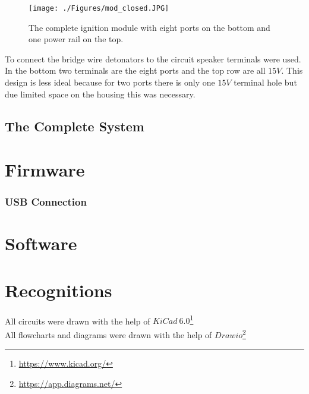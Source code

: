 \begin{figure}[!ht]
    \centering
    \texttt{[image: ./Figures/mod\_closed.JPG]}
    \caption{The complete ignition module with eight ports on the bottom and one power rail on the top.}
    \label{fig:mod_closed}     
\end{figure}

\noindent To connect the bridge wire detonators to the circuit speaker terminals were used.  In  the bottom two terminals are the eight ports and the top row are all $15V$. This design is less ideal because for two ports there is only one $15V$ terminal hole but due limited space on the housing this was necessary. \\

\pagebreak

\subsection{The Complete System}

\section{Firmware}
\label{Firmware}

\subsubsection{USB Connection}
\label{USB Connection}

\section{Software}
\label{Software}


\pagebreak

\section{Recognitions}
\label{Recognitions}
All circuits were drawn with the help of $KiCad\ 6.0$\footnote{\url{https://www.kicad.org/}}\\

\noindent All flowcharts and diagrams were drawn with the help of $Drawio$\footnote{\url{https://app.diagrams.net/}}




